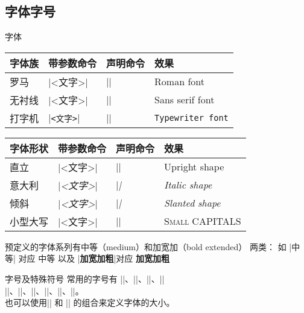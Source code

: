 \subsection{字体字号}
\begin{frame}[fragile]{字体}
	
	\begin{table}
		\centering
		\begin{tabular}{llll}
		\toprule       
		字体族		&	带参数命令	&	声明命令	& 	效果	\\
		\midrule
		罗马		&		|\textrm{<文字>}|		& |\rmfamily|	&	\textrm{Roman font}		\\
		无衬线		&		|\textsf{<文字>}|		&|\sffamily|	&	\textsf{Sans serif font}		\\
		打字机		&		|\texttt{<文字>}|		& |\ttfamily|	&	\texttt{Typewriter font}		\\
		\bottomrule
		\end{tabular}
	\end{table}
	
	\begin{table}
		\centering
		\begin{tabular}{llll}
			\toprule
			字体形状	&		带参数命令	&	声明命令	& 	效果	\\
			\midrule
			直立			&		 |\textup{<文字>}|	&		|\upshape|		&	\textup{Upright shape}	\\
			意大利		&		  |\textit{<文字>}|		&	   |\itshape|		 &	  \textit{Italic shape}		\\
			倾斜			&		|\textsl{<文字>}|			&	|\slshape|			&	\textsl{Slanted shape}	\\
			小型大写	&	 |\textsc{<文字>}|		&	|\scshape|			&\textsc{Small CAPITALS} 	\\
			\bottomrule
		\end{tabular}
	\end{table}
	预定义的字体系列有中等（medium）和加宽加（bold extended）	两类：
	如 |\textmd{中等}|	对应 	\textmd{中等}	以及 |\textbf{加宽加粗}|对应 \textbf{加宽加粗}
\end{frame}

	\begin{frame}[fragile]{字号及特殊符号}
		常用的字号有 |\tiny|、|\scriptsize|、|\footnotesize|、|\small|  \\
		|\normalsize|、|\large|、|\Large|、|\LARGE|、|\huge|、|\Huge|。\\
		也可以使用|\fontsize{大小}{行距}| 和 |\selectfont| 的组合来定义字体的大小。
	\end{frame}